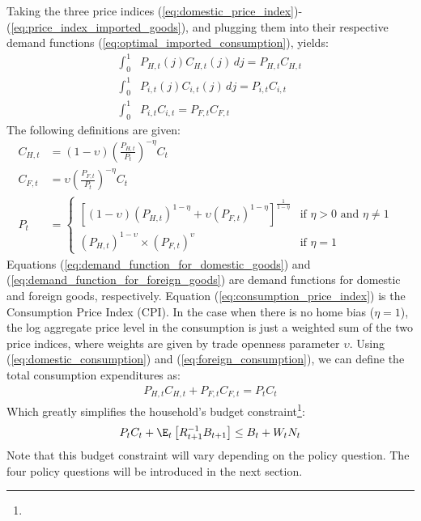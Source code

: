 Taking the three price indices (\ref{eq:domestic_price_index})-(\ref{eq:price_index_imported_goods}), and plugging them into their respective demand functions (\ref{eq:optimal_imported_consumption}), yields:
\begin{align}
    \int_{0}^{1} & P_{H,t}(j)C_{H,t}(j) \,dj = P_{H,t}C_{H,t} \label{eq:domestic_consumption}\\
    \int_{0}^{1} & P_{i,t}(j)C_{i,t}(j) \,dj = P_{i,t}C_{i,t} \\
    \int_{0}^{1} & P_{i,t}C_{i,t} = P_{F,t}C_{F,t} \label{eq:foreign_consumption}
\end{align}
The following definitions are given:
\begin{align}
    C_{H,t} & = (1-\upsilon) {\left(\frac{P_{H,t}}{P_t}\right)}^{-\eta} C_{t} \label{eq:demand_function_for_domestic_goods} & \\
    C_{F,t} & = \upsilon {\left(\frac{P_{F,t}}{P_t}\right)}^{-\eta} C_{t} \label{eq:demand_function_for_foreign_goods} & \\
    P_t &= \begin{cases}
        \left[ (1-\upsilon) (P_{H,t})^{1-\eta} + \upsilon (P_{F,t})^{1-\eta} \right]^{\frac{1}{1-\eta}} \label{eq:consumption_price_index} & \text{if $\eta > 0$ and $\eta \ne 1$}\\
        (P_{H,t})^{1-\upsilon} \times (P_{F,t})^{\upsilon} & \text{if $\eta = 1$}
    \end{cases}
\end{align}
Equations (\ref{eq:demand_function_for_domestic_goods}) and (\ref{eq:demand_function_for_foreign_goods}) are demand functions for domestic and foreign goods, respectively. Equation (\ref{eq:consumption_price_index}) is the Consumption Price Index (CPI). In the case when there is no home bias ($\eta = 1$), the log aggregate price level in the consumption is just a weighted sum of the two price indices, where weights are given by trade openness parameter $\upsilon$. Using (\ref{eq:domestic_consumption}) and (\ref{eq:foreign_consumption}), we can define the total consumption expenditures as:
\begin{align}
    P_{H,t}C_{H,t} + P_{F,t}C_{F,t} = P_t C_t
\end{align}
Which greatly simplifies the household's budget constraint\footnote{}:
\begin{equation}
    P_t C_t + \E_t \left[ R^{-1}_{t+1} B_{t+1} \right] \leq B_t + W_t N_t
\end{equation}
Note that this budget constraint will vary depending on the policy question. The four policy questions will be introduced in the next section.

